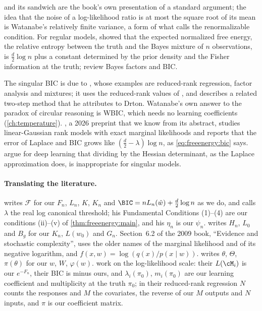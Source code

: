 \begin{refsection}
 and its sandwich are the book's own presentation of a standard argument; the idea that the noise of a log-likelihood ratio is at most the square root of its mean is Watanabe's relatively finite variance, a form of what \textcite{Watanabe2010d} calls the renormalizable condition. For regular models, \textcite{ClarkeBarron1990} showed that the expected normalized free energy, the relative entropy between the truth and the Bayes mixture of $n$ observations, is $\frac d2\log n$ plus a constant determined by the prior density and the Fisher information at the truth; \textcite{KassRaftery1995} review Bayes factors and BIC.

The singular BIC is due to \textcite{DrtonPlummer2017}, whose examples are reduced-rank regression, factor analysis and mixtures; it uses the reduced-rank values of \textcite{AoyagiWatanabe2005}, and \textcite[\S7.2]{Watanabe2013} describes a related two-step method that he attributes to Drton. Watanabe's own answer to the paradox of circular reasoning is WBIC, which needs no learning coefficients (\cref{ch:temperature}). \Textcite{Rao2026}, a 2026 preprint that we know from its abstract, studies linear-Gaussian rank models with exact marginal likelihoods and reports that the error of Laplace and BIC grows like $(\frac d2-\lambda)\log n$, as \eqref{eq:freeenergy:bic} says. \Textcite{WeiEtAl2023} argue for deep learning that dividing by the Hessian determinant, as the Laplace approximation does, is inappropriate for singular models.

\paragraph{Translating the literature.} \Textcite{Watanabe2013} writes $\mathcal F$ for our $F_n$, $L_n$, $K$, $K_n$ and $\BIC=nL_n(\hat w)+\frac d2\log n$ as we do, and calls $\lambda$ the real log canonical threshold; his Fundamental Conditions (1)--(4) are our conditions (ii)--(v) of \cref{thm:freeenergy:main}, and his $\eta_n$ is our $\psi_n$. \Textcite{Watanabe2010d} writes $H_n$, $L_0$ and $B_g$ for our $K_n$, $L(w_0)$ and $G_n$. Section~6.2 of the 2009 book, ``Evidence and stochastic complexity'', uses the older names of the marginal likelihood and of its negative logarithm, and $f(x,w)=\log(q(x)/p(x\mid w))$. \Textcite{Watanabe2024} writes $\theta$, $\Theta$, $\pi(\theta)$ for our $w$, $W$, $\varphi(w)$. \Textcite{DrtonPlummer2017} work on the log-likelihood scale: their $L(\cM_i)$ is our $e^{-F_n}$, their BIC is minus ours, and $\lambda_i(\pi_0)$, $m_i(\pi_0)$ are our learning coefficient and multiplicity at the truth $\pi_0$; in their reduced-rank regression $N$ counts the responses and $M$ the covariates, the reverse of our $M$ outputs and $N$ inputs, and $\pi$ is our coefficient matrix.

\printchapterbib
\end{refsection}
